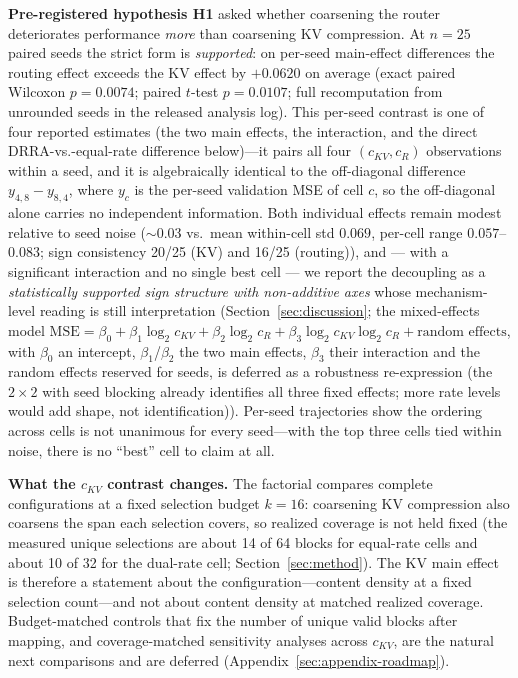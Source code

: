 \textbf{Pre-registered hypothesis H1} asked whether coarsening the router
deteriorates performance \emph{more} than coarsening KV compression. At
$n{=}25$ paired seeds the strict form is \emph{supported}: on per-seed
main-effect differences the routing effect exceeds the KV effect by $+0.0620$ on
average (exact paired Wilcoxon $p = 0.0074$; paired $t$-test $p = 0.0107$;
full recomputation from unrounded seeds in the released analysis log). This
per-seed contrast is one of four reported estimates (the two main effects, the
interaction, and the direct DRRA-vs.-equal-rate difference below)---it pairs all
four $(c_{KV}, c_R)$ observations within a seed, and it is algebraically identical
to the off-diagonal difference $y_{4,8} - y_{8,4}$, where $y_{c}$ is the
per-seed validation MSE of cell $c$, so the off-diagonal alone carries
no independent information. Both individual effects remain modest relative to seed noise (${\sim}0.03$ vs.\ mean
within-cell std $0.069$, per-cell range $0.057$--$0.083$; sign consistency
20/25 (KV) and 16/25 (routing)), and --- with a significant interaction and no single
best cell --- we report the decoupling as a \emph{statistically supported sign structure
with non-additive axes} whose mechanism-level reading is still
interpretation (Section~\ref{sec:discussion}; the mixed-effects model
$\mathrm{MSE} = \beta_0 + \beta_1 \log_2 c_{KV} + \beta_2 \log_2 c_R +
\beta_3 \log_2 c_{KV}\log_2 c_R + \text{random effects}$, with $\beta_0$ an
intercept, $\beta_1$/$\beta_2$ the two main effects, $\beta_3$ their
interaction and the random effects reserved for seeds, is deferred as a robustness re-expression (the $2\times2$ with seed blocking already
identifies all three fixed effects; more rate levels would add shape, not
identification)). Per-seed trajectories show the
ordering across cells is not unanimous for every seed---with the top three cells tied
within noise, there is no ``best'' cell to claim at all.

\textbf{What the $c_{KV}$ contrast changes.} The factorial compares complete
configurations at a fixed selection budget $k{=}16$: coarsening KV compression also
coarsens the span each selection covers, so realized coverage is not held fixed
(the measured unique selections are about 14 of 64 blocks for equal-rate cells
and about 10 of 32 for the dual-rate cell; Section~\ref{sec:method}). The KV main
effect is therefore a statement about the configuration---content density at a
fixed selection count---and not about content density at matched realized
coverage. Budget-matched controls that fix the number of unique valid blocks
after mapping, and coverage-matched sensitivity analyses across $c_{KV}$, are the
natural next comparisons and are deferred (Appendix~\ref{sec:appendix-roadmap}).

